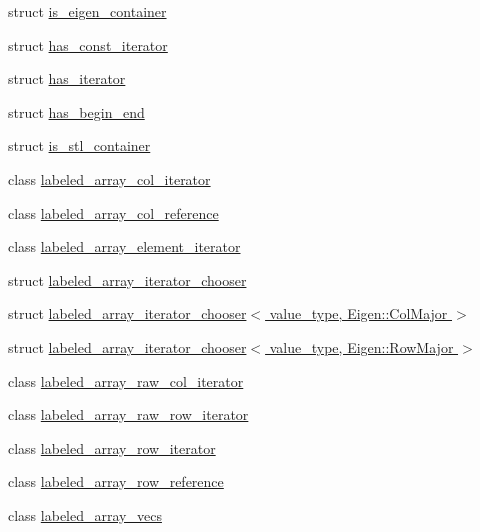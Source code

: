 \begin{DoxyCompactItemize}
\item 
struct \hyperlink{namespaceIceBRG_structIceBRG_1_1is__eigen__container}{is\-\_\-eigen\-\_\-container}
\item 
struct \hyperlink{structIceBRG_1_1has__const__iterator}{has\-\_\-const\-\_\-iterator}
\item 
struct \hyperlink{structIceBRG_1_1has__iterator}{has\-\_\-iterator}
\item 
struct \hyperlink{structIceBRG_1_1has__begin__end}{has\-\_\-begin\-\_\-end}
\item 
struct \hyperlink{namespaceIceBRG_structIceBRG_1_1is__stl__container}{is\-\_\-stl\-\_\-container}
\item 
class \hyperlink{classIceBRG_1_1labeled__array__col__iterator}{labeled\-\_\-array\-\_\-col\-\_\-iterator}
\item 
class \hyperlink{classIceBRG_1_1labeled__array__col__reference}{labeled\-\_\-array\-\_\-col\-\_\-reference}
\item 
class \hyperlink{classIceBRG_1_1labeled__array__element__iterator}{labeled\-\_\-array\-\_\-element\-\_\-iterator}
\item 
struct \hyperlink{namespaceIceBRG_structIceBRG_1_1labeled__array__iterator__chooser}{labeled\-\_\-array\-\_\-iterator\-\_\-chooser}
\item 
struct \hyperlink{structIceBRG_1_1labeled__array__iterator__chooser_3_01value__type_00_01Eigen_1_1ColMajor_01_4}{labeled\-\_\-array\-\_\-iterator\-\_\-chooser$<$ value\-\_\-type, Eigen\-::\-Col\-Major $>$}
\item 
struct \hyperlink{structIceBRG_1_1labeled__array__iterator__chooser_3_01value__type_00_01Eigen_1_1RowMajor_01_4}{labeled\-\_\-array\-\_\-iterator\-\_\-chooser$<$ value\-\_\-type, Eigen\-::\-Row\-Major $>$}
\item 
class \hyperlink{classIceBRG_1_1labeled__array__raw__col__iterator}{labeled\-\_\-array\-\_\-raw\-\_\-col\-\_\-iterator}
\item 
class \hyperlink{classIceBRG_1_1labeled__array__raw__row__iterator}{labeled\-\_\-array\-\_\-raw\-\_\-row\-\_\-iterator}
\item 
class \hyperlink{classIceBRG_1_1labeled__array__row__iterator}{labeled\-\_\-array\-\_\-row\-\_\-iterator}
\item 
class \hyperlink{classIceBRG_1_1labeled__array__row__reference}{labeled\-\_\-array\-\_\-row\-\_\-reference}
\item 
class \hyperlink{classIceBRG_1_1labeled__array__vecs}{labeled\-\_\-array\-\_\-vecs}
\item 

\end{DoxyCompactItemize}
